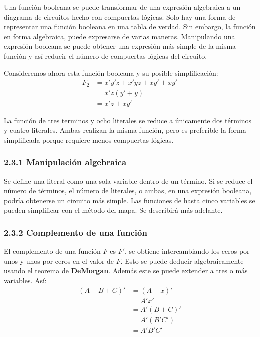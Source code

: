 \documentclass{article}
\begin{document}
Una funci\'{o}n booleana se puede transformar de una expresi\'{o}n algebraica a un diagrama
de circuitos hecho con compuertas l\'{o}gicas. Solo hay una forma de representar una funci\'{o}n
booleana en una tabla de verdad. Sin embargo, la funci\'{o}n en forma algebraica, puede expresarse
de varias maneras. Manipulando una expresi\'{o}n booleana se puede obtener una expresi\'{o}n m\'{a}s
simple de la misma funci\'{o}n y as\'{i} reducir el n\'{u}mero de compuertas l\'{o}gicas del circuito.

\newpage
Consideremos ahora esta funci\'{o}n booleana y su posible simplificaci\'{o}n:
\begin{align*}
    F_2 &= x'y'z + x'yz + xy' + xy' \\
    &= x'z(y' + y) \\
    &= x'z + xy'
\end{align*}

La funci\'{o}n de tres terminos y ocho literales se reduce a \'{u}nicamente dos t\'{e}rminos 
y cuatro literales. Ambas realizan la misma funci\'{o}n, pero es preferible la forma simplificada
porque requiere menos compuertas l\'{o}gicas.

\subsubsection*{2.3.1 Manipulaci\'{o}n algebraica}
Se define una literal como una sola variable dentro de un t\'{e}rmino. Si se reduce el n\'{u}mero
de t\'{e}rminos, el n\'{u}mero de literales, o ambas, en una expresi\'{o}n booleana, podr\'{i}a 
obtenerse un circuito m\'{a}s simple. Las funciones de hasta cinco variables se pueden simplificar
con el m\'{e}todo del mapa. Se describir\'{a} m\'{a}s adelante.

\subsubsection*{2.3.2 Complemento de una funci\'{o}n}
El complemento de una funci\'{o}n $F$ es $F'$, se obtiene intercambiando los ceros por unos y unos 
por ceros en el valor de $F$. Esto se puede deducir algebraicamente usando el teorema de 
\textbf{DeMorgan}. Adem\'{a}s este se puede extender a tres o m\'{a}s variables. As\'{i}:
\begin{align*}
    (A + B + C)' &= (A + x)' \\
    &= A'x' \\
    &= A'(B + C)' \\
    &= A'(B'C') \\
    &= A'B'C'
\end{align*}
\medbreak
\end{document}
